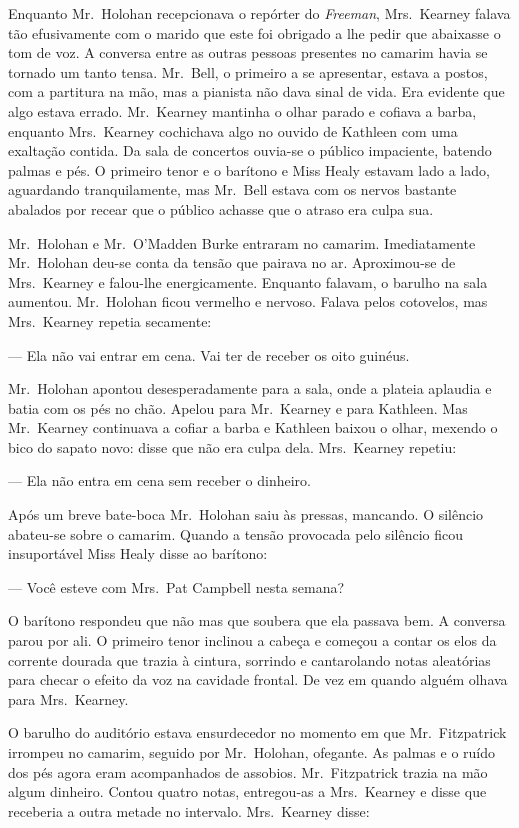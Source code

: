 Enquanto Mr.~Holohan recepcionava o repórter do \textit{Freeman}, Mrs.~Kearney
falava tão efusivamente com o marido que este foi obrigado a lhe pedir que
abaixasse o tom de voz.  A conversa entre as outras pessoas presentes no
camarim havia se tornado um tanto tensa.  Mr.~Bell, o primeiro a se
apresentar, estava a postos, com a partitura na mão, mas a pianista não dava
sinal de vida.  Era evidente que algo estava errado.  Mr.~Kearney mantinha o
olhar parado e cofiava a barba, enquanto Mrs.~Kearney cochichava algo no ouvido
de Kathleen com uma exaltação contida.  Da sala de concertos ouvia-se o público
impaciente, batendo palmas e pés.  O primeiro tenor e o barítono e Miss Healy
estavam lado a lado, aguardando tranquilamente, mas Mr.~Bell estava com os
nervos bastante abalados por recear que o público achasse que o atraso era
culpa sua.

Mr.~Holohan e Mr.~O’Madden Burke entraram no camarim.  Imediatamente 
Mr.~Holohan deu-se conta da tensão que pairava no ar.  Aproximou-se de 
Mrs.~Kearney e falou-lhe energicamente.  Enquanto falavam, o barulho na sala
aumentou.  Mr.~Holohan ficou vermelho e nervoso.  Falava pelos cotovelos, mas
Mrs.~Kearney repetia secamente:

--- Ela não vai entrar em cena.  Vai ter de receber os oito guinéus.

Mr.~Holohan apontou desesperadamente para a sala, onde a plateia aplaudia e
batia com os pés no chão.  Apelou para Mr.~Kearney e para Kathleen.  
Mas Mr.~Kearney continuava a cofiar a barba e Kathleen baixou o olhar, mexendo o bico
do sapato novo: disse que não era culpa dela.  Mrs.~Kearney repetiu:

--- Ela não entra em cena sem receber o dinheiro.

Após um breve bate-boca Mr.~Holohan saiu às pressas, mancando.  O silêncio
abateu-se sobre o camarim.  Quando a tensão provocada pelo silêncio ficou
insuportável Miss Healy disse ao barítono:

--- Você esteve com Mrs.~Pat Campbell nesta semana?

O barítono respondeu que não mas que soubera que ela passava bem.  A conversa
parou por ali.  O primeiro tenor inclinou a cabeça e começou a contar os elos
da corrente dourada que trazia à cintura, sorrindo e cantarolando notas
aleatórias para checar o efeito da voz na cavidade frontal.  De vez em quando
alguém olhava para Mrs.~Kearney.

O barulho do auditório estava ensurdecedor no momento em que Mr.~Fitzpatrick
irrompeu no camarim, seguido por Mr.~Holohan, ofegante.  As palmas e o ruído
dos pés agora eram acompanhados de assobios.  Mr.~Fitzpatrick trazia na mão
algum dinheiro.  Contou quatro notas, entregou-as a Mrs.~Kearney e disse que
receberia a outra metade no intervalo.  Mrs.~Kearney disse:

